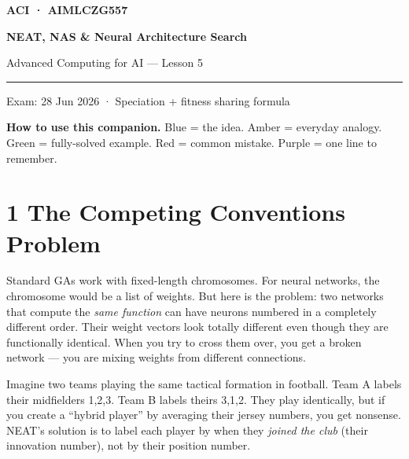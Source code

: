 \documentclass[a4paper,11pt]{article}
\begin{document}
\begin{tcolorbox}[enhanced,colback=NavyBanner,colframe=NavyBanner,arc=0pt,
  boxrule=0pt,left=10mm,right=10mm,top=8mm,bottom=8mm]
  {\small\bfseries\sffamily\color{white}\MakeUppercase{ACI · AIMLCZG557}}\par\vspace{4pt}
  {\LARGE\bfseries\sffamily\color{white}NEAT, NAS \& Neural Architecture Search}\par\vspace{4pt}
  {\normalsize\color{white!80!NavyBanner}Advanced Computing for AI — Lesson 5}\par
  \textcolor{white!40!NavyBanner}{\rule{\linewidth}{0.4pt}}\par\vspace{2pt}
  {\small\color{white!70!NavyBanner}Exam: 28 Jun 2026 · Speciation + fitness sharing formula}
\end{tcolorbox}

\vspace{4pt}
{\small\textbf{How to use this companion.} \textcolor{IntFrame}{Blue} = the idea. \textcolor{EveFrame}{Amber} = everyday analogy. \textcolor{WrkFrame}{Green} = fully-solved example. \textcolor{WatFrame}{Red} = common mistake. \textcolor{KeyFrame}{Purple} = one line to remember.}

\vspace{8pt}

\section{1 \quad The Competing Conventions Problem}

Standard GAs work with fixed-length chromosomes. For neural networks, the chromosome would be a list of weights. But here is the problem: two networks that compute the \emph{same function} can have neurons numbered in a completely different order. Their weight vectors look totally different even though they are functionally identical. When you try to cross them over, you get a broken network — you are mixing weights from different connections.

\begin{intuition}
Imagine two teams playing the same tactical formation in football. Team A labels their midfielders 1,2,3. Team B labels theirs 3,1,2. They play identically, but if you create a ``hybrid player'' by averaging their jersey numbers, you get nonsense. NEAT's solution is to label each player by when they \emph{joined the club} (their innovation number), not by their position number.
\end{intuition}
\end{document}
